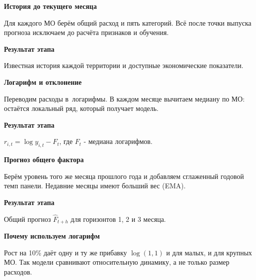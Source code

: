\documentclass[12pt,a4paper,landscape]{article}
\newcommand{\Aside}[1]{\par{\fontsize{15}{19}\selectfont\bfseries\color{Green}#1\par}\vspace{2mm}}
\begin{document}
\par\vspace{7mm}
\begin{minipage}[t]{.30\linewidth}\par\vspace{0pt}\RaggedRight
\Aside{История до текущего месяца}
Для каждого МО берём общий расход и пять категорий. Всё после точки выпуска прогноза исключаем до расчёта признаков и обучения.
\par\vspace{5mm}\Aside{Результат этапа}
Известная история каждой территории и доступные экономические показатели.
\end{minipage}\hfill
\begin{minipage}[t]{.30\linewidth}\par\vspace{0pt}\RaggedRight
\Aside{Логарифм и отклонение}
Переводим расходы в~логарифмы. В каждом месяце вычитаем медиану по МО: остаётся локальный ряд, который получает модель.
\par\vspace{5mm}\Aside{Результат этапа}
$r_{i,t}=\log y_{i,t}-F_t$, где $F_t$ - медиана логарифмов.
\end{minipage}\hfill
\begin{minipage}[t]{.30\linewidth}\par\vspace{0pt}\RaggedRight
\Aside{Прогноз общего фактора}
Берём уровень того же месяца прошлого года и добавляем сглаженный годовой темп панели. Недавние месяцы имеют больший вес (EMA).
\par\vspace{5mm}\Aside{Результат этапа}
Общий прогноз $\widehat F_{t+h}$ для горизонтов 1, 2 и 3 месяца.
\end{minipage}
\par\vspace{10mm}\Aside{Почему используем логарифм}
Рост на 10\% даёт одну и ту же прибавку $\log(1{,}1)$ и для малых, и для крупных МО. Так модели сравнивают относительную динамику, а не только размер расходов.
\end{document}
